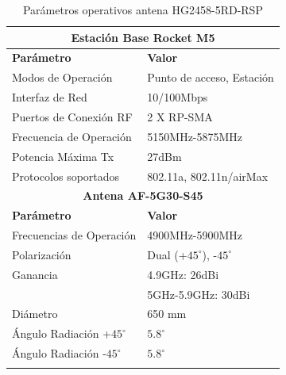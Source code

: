 \documentclass[conference]{IEEEtran}
\begin{document}
\begin{table}[!hbt]
    \begin{center}
        \begin{tabular}{ l  l }
            \hline
            \multicolumn{2}{c}{\textbf{Estación Base Rocket M5}} \\
            \hline
            \hline
            \textbf{Parámetro} & \textbf{Valor}\\
            \hline
            Modos de Operación & Punto de acceso, Estación\\
            Interfaz de Red & 10/100Mbps \\
            Puertos de Conexión RF & 2 X RP-SMA \\
            Frecuencia de Operación & 5150MHz-5875MHz \\
            Potencia Máxima Tx & 27dBm\\
            Protocolos soportados & 802.11a, 802.11n/airMax \\
            \hline
            \multicolumn{2}{c}{\textbf{Antena AF-5G30-S45}} \\
            \hline
            \hline
            \textbf{Parámetro} & \textbf{Valor}\\
            \hline
            Frecuencias de Operación & 4900MHz-5900MHz \\
            Polarización & Dual (+$45^\circ$), -$45^\circ$\\
            Ganancia & 4.9GHz: 26dBi \\
                     & 5GHz-5.9GHz: 30dBi \\
            Diámetro & 650 mm \\
            Ángulo Radiación +$45^\circ$  & $5.8^\circ$ \\
            Ángulo Radiación -$45^\circ$  & $5.8^\circ$\\
            \hline\\
        \end{tabular}
    \caption[]{Parámetros operativos antena HG2458-5RD-RSP}
    \label{Cuadro:1}
    \end{center}
\end{table}
\end{document}
